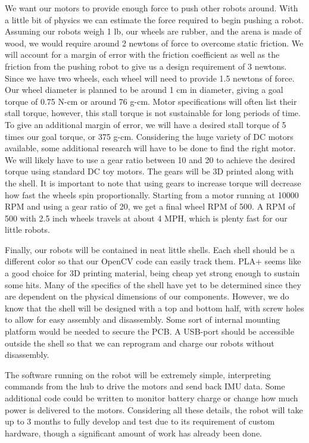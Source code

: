 \documentclass[11pt]{ieeeconf}
\begin{document}
We want our motors to provide enough force to push other robots around. With a little bit of physics we can estimate the force required to begin pushing a robot. Assuming our robots weigh 1 lb, our wheels are rubber, and the arena is made of wood, we would require around 2 newtons of force to overcome static friction. We will account for a margin of error with the friction coefficient as well as the friction from the pushing robot to give us a design requirement of 3 newtons. Since we have two wheels, each wheel will need to provide 1.5 newtons of force. Our wheel diameter is planned to be around 1 cm in diameter, giving a goal torque of 0.75 N-cm or around 76 g-cm. Motor specifications will often list their stall torque, however, this stall torque is not sustainable for long periods of time. To give an additional margin of error, we will have a desired stall torque of 5 times our goal torque, or 375 g-cm. Considering the huge variety of DC motors available, some additional research will have to be done to find the right motor. We will likely have to use a gear ratio between 10 and 20 to achieve the desired torque using standard DC toy motors. The gears will be 3D printed along with the shell. It is important to note that using gears to increase torque will decrease how fast the wheels spin proportionally. Starting from a motor running at 10000 RPM and using a gear ratio of 20, we get a final wheel RPM of 500. A RPM of 500 with 2.5 inch wheels travels at about 4 MPH, which is plenty fast for our little robots.

Finally, our robots will be contained in neat little shells. Each shell should be a different color so that our OpenCV code can easily track them. PLA+ seems like a good choice for 3D printing material, being cheap yet strong enough to sustain some hits. Many of the specifics of the shell have yet to be determined since they are dependent on the physical dimensions of our components. However, we do know that the shell will be designed with a top and bottom half, with screw holes to allow for easy assembly and disassembly. Some sort of internal mounting platform would be needed to secure the PCB. A USB-port should be accessible outside the shell so that we can reprogram and charge our robots without disassembly. 

The software running on the robot will be extremely simple, interpreting commands from the hub to drive the motors and send back IMU data. Some additional code could be written to monitor battery charge or change how much power is delivered to the motors. Considering all these details, the robot will take up to 3 months to fully develop and test due to its requirement of custom hardware, though a significant amount of work has already been done.
\end{document}
